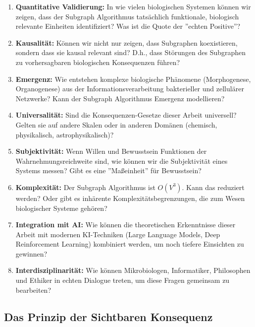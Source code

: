 \documentclass[a4paper,12pt]{article}
\theoremstyle{definition}
\begin{document}
\begin{enumerate}
    \item \textbf{Quantitative Validierung:} In wie vielen biologischen Systemen können wir zeigen, dass der Subgraph Algorithmus tatsächlich funktionale, biologisch relevante Einheiten identifiziert? Was ist die Quote der ''echten Positive''?
    
    \item \textbf{Kausalität:} Können wir nicht nur zeigen, dass Subgraphen koexistieren, sondern dass sie kausal relevant sind? D.h., dass Störungen des Subgraphen zu vorhersagbaren biologischen Konsequenzen führen?
    
    \item \textbf{Emergenz:} Wie entstehen komplexe biologische Phänomene (Morphogenese, Organogenese) aus der Informationsverarbeitung bakterieller und zellulärer Netzwerke? Kann der Subgraph Algorithmus Emergenz modellieren?
    
    \item \textbf{Universalität:} Sind die Konsequenzen-Gesetze dieser Arbeit universell? Gelten sie auf andere Skalen oder in anderen Domänen (chemisch, physikalisch, astrophysikalisch)?
    
    \item \textbf{Subjektivität:} Wenn Willen und Bewusstsein Funktionen der Wahrnehmungsreichweite sind, wie können wir die Subjektivität eines Systems messen? Gibt es eine ''Maßeinheit'' für Bewusstsein?
    
    \item \textbf{Komplexität:} Der Subgraph Algorithmus ist $O(V^3)$. Kann das reduziert werden? Oder gibt es inhärente Komplexitätsbegrenzungen, die zum Wesen biologischer Systeme gehören?
    
    \item \textbf{Integration mit AI:} Wie können die theoretischen Erkenntnisse dieser Arbeit mit modernen KI-Techniken (Large Language Models, Deep Reinforcement Learning) kombiniert werden, um noch tiefere Einsichten zu gewinnen?
    
    \item \textbf{Interdisziplinarität:} Wie können Mikrobiologen, Informatiker, Philosophen und Ethiker in echten Dialogue treten, um diese Fragen gemeinsam zu bearbeiten?
\end{enumerate}

\subsection{Das Prinzip der Sichtbaren Konsequenz}
\end{document}

